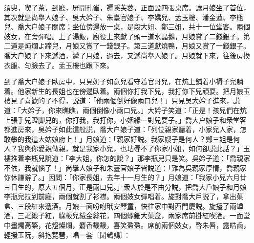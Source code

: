 須臾，喫了茶，到廳，屏開孔雀，褥隱芙蓉，正面設四張桌席。讓月娘坐了首位，其次就是尚擧人娘子、吳大妗子、朱臺官娘子、李嬌兒、孟玉樓、潘金蓮、李瓶兒、喬大户娘子關席；坐位傍邊放一桌，是段大姐、鄭三姐，共十一位堂客。兩個妓女，在旁彈唱。上了湯飯，廚役上來獻了頭一道水晶鵝，月娘賞了二錢銀子。第二道是炖爛よ蹄兒，月娘又賞了一錢銀子。第三道獻燒鴨，月娘又賞了一錢銀子。喬大户娘子下來遞酒，遞了月娘，過去，又遞尚擧人娘子。月娘就下來，往後房換衣服、匀臉去了。孟玉樓也跟下來。

到了喬大户娘子臥房中，只見奶子如意兒看守着官哥兒，在炕上鋪着小褥子兒躺着。他家新生的長姐也在傍邊臥着。兩個你打我下兒，我打你下兒頑耍。把月娘玉樓見了喜歡的了不得，説道：「他兩個倒好像兩口兒！」只見吳大妗子進來，説道：「大妗子，你來瞧瞧，兩個倒像小兩口兒。」大妗子笑道：「正是！孩兒們在炕上張手兒蹬脚兒的，你打我，我打你，小姻緣一對兒耍子。」喬大户娘子和衆堂客都進房來，吳妗子如此這般説，喬大户娘子道：「列位親家聽着，小家兒人家，怎敢攀的我這大姑娘府上！」月娘道：「親家好説。我家嫂子是何人？鄭三姐是何人？我與你愛親做親，就是我家小兒，也玷辱不了你家小姐，如何卻説此話？」玉樓推着李瓶兒說道：「李大姐，你怎的說？」那李瓶兒只是笑。吳妗子道：「喬親家不依，我就惱了！」尚擧人娘子和朱臺官娘子皆説道：「難為吳親家厚情，喬親家你休謙辭了。」因問：「你家長姐，去年十一月生的？」月娘道：「我家小兒六月廿三日生的，原大五個月，正是兩口兒。」衆人於是不由分説，把喬大戶娘子和月娘李瓶兒拉到前廳，兩個就割了衫襟。兩個妓女彈唱着。旋對喬大戶説了，拿出菓盒、三段紅來遞酒。月娘一面吩咐玳安琴童，快往家中對西門慶説。旋擡了兩罈酒，三疋緞子紅，綠板兒絨金絲花，四個螺鈿大菓盒，兩家席前掛紅喫酒。一面堂中畫燭高檠，花燈燦爛，麝香靉靉，喜笑盈盈。席前兩個妓女，啓朱唇，露皓齒，輕撥玉阮，斜抱琵琶，唱一套〔鬦鵪鶉〕：

